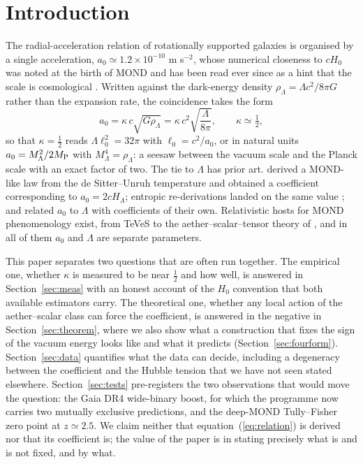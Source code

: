 \documentclass[fleqn,usenatbib]{mnras}
\begin{document}
\section{Introduction}
The radial-acceleration relation of rotationally supported galaxies \citep{McGaugh2016,Lelli2017} is organised by a single acceleration, $a_0\simeq1.2\times10^{-10}$ m s$^{-2}$, whose numerical closeness to $cH_0$ was noted at the birth of MOND \citep{Milgrom1983} and has been read ever since as a hint that the scale is cosmological \citep{SandersMcGaugh2002,FamaeyMcGaugh2012}. Written against the dark-energy density $\rho_\Lambda=\Lambda c^2/8\pi G$ rather than the expansion rate, the coincidence takes the form
\begin{equation}
a_0=\kappa\,c\sqrt{G\rho_\Lambda}=\kappa\,c^2\sqrt{\frac{\Lambda}{8\pi}},\qquad \kappa\simeq\tfrac12,
\label{eq:relation}
\end{equation}
so that $\kappa=\tfrac12$ reads $\Lambda\ell_0^2=32\pi$ with $\ell_0=c^2/a_0$, or in natural units $a_0=M_\Lambda^2/2M_{\rm P}$ with $M_\Lambda^4=\rho_\Lambda$: a seesaw between the vacuum scale and the Planck scale with an exact factor of two. The tie to $\Lambda$ has prior art. \citet{Milgrom1999} derived a MOND-like law from the de Sitter--Unruh temperature and obtained a coefficient corresponding to $a_0=2cH_\Lambda$; entropic re-derivations landed on the same value \citep{Pikhitsa2010,KlinkhamerKopp2011}; \citet{BlanchetLeTiec2009} and \citet{Singh2026} related $a_0$ to $\Lambda$ with coefficients of their own. Relativistic hosts for MOND phenomenology exist, from TeVeS \citep{Bekenstein2004} to the aether--scalar--tensor theory of \citet{SkordisZlosnik2021}, and in all of them $a_0$ and $\Lambda$ are separate parameters.

This paper separates two questions that are often run together. The empirical one, whether $\kappa$ is measured to be near $\tfrac12$ and how well, is answered in Section~\ref{sec:meas} with an honest account of the $H_0$ convention that both available estimators carry. The theoretical one, whether any local action of the aether--scalar class can force the coefficient, is answered in the negative in Section~\ref{sec:theorem}, where we also show what a construction that fixes the sign of the vacuum energy looks like and what it predicts (Section~\ref{sec:fourform}). Section~\ref{sec:data} quantifies what the data can decide, including a degeneracy between the coefficient and the Hubble tension that we have not seen stated elsewhere. Section~\ref{sec:tests} pre-registers the two observations that would move the question: the Gaia DR4 wide-binary boost, for which the programme now carries two mutually exclusive predictions, and the deep-MOND Tully--Fisher zero point at $z\simeq2.5$. We claim neither that equation~(\ref{eq:relation}) is derived nor that its coefficient is; the value of the paper is in stating precisely what is and is not fixed, and by what.
\end{document}
